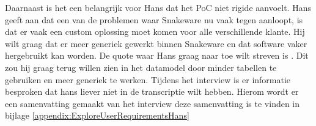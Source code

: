 \whitespace
Daarnaast is het een belangrijk voor Hans dat het PoC niet rigide aanvoelt.
Hans geeft aan dat een van de problemen waar Snakeware nu vaak tegen aanloopt, is dat er vaak een custom oplossing moet komen voor alle verschillende klante.
Hij wilt graag dat er meer generiek gewerkt binnen Snakeware en dat software vaker hergebruikt kan worden. 
De quote waar Hans graag naar toe wilt streven is .
Dit zou hij graag terug willen zien in het datamodel door minder tabellen te gebruiken en meer generiek te werken.
Tijdens het interview is er informatie besproken dat hans liever niet in de transcriptie wilt hebben.
Hierom wordt er een samenvatting gemaakt van het interview deze samenvatting is te vinden in bijlage \ref{appendix:ExploreUserRequirementsHans}
%


%
%
%

